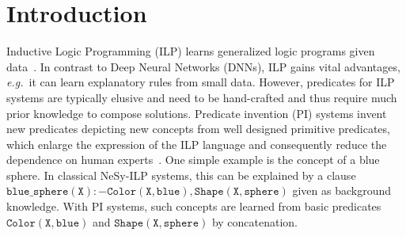 \documentclass[
]{ceurart}
\newcommand{\eg}{\emph{e.g.}~}
\begin{document}
	\section{Introduction}
	
	
	
	Inductive Logic Programming (ILP) learns generalized logic programs given data~\cite{Muggleton91,Nienhuys97,Cropper20}.
	In contrast to Deep Neural Networks (DNNs), ILP gains vital advantages, \eg it can learn explanatory rules from small data.
	However, predicates for ILP systems are typically elusive and need to be hand-crafted and thus require much prior knowledge to compose solutions.
	Predicate invention (PI) systems invent new predicates depicting new concepts from well designed primitive predicates, which enlarge the expression of the ILP language and consequently reduce the dependence on human experts~\cite{pi1988}. 
	One simple example is the concept of a blue sphere. In classical NeSy-ILP systems, this can be explained by a clause $\mathtt{blue\_sphere(X):-Color(X,blue),Shape(X,sphere)} $ given as background knowledge. With PI systems, such concepts are learned from basic predicates $ \mathtt{Color(X,blue)} $ and $ \mathtt{Shape(X,sphere)} $ by concatenation. 
	
	
	
	
	
\end{document}
